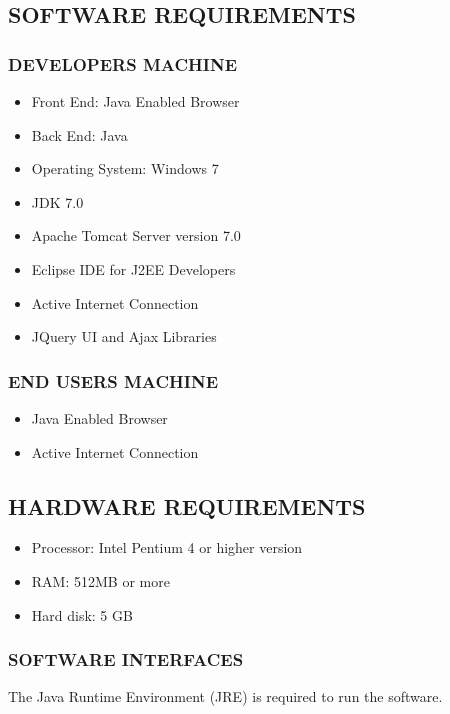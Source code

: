 \documentclass[12pt]{report}
\begin{document}
\subsection{SOFTWARE REQUIREMENTS}
\subsubsection{DEVELOPERS MACHINE}
\begin{itemize}
\item{	Front End: Java Enabled Browser }
\item{	Back End: Java }
\item{	Operating System: Windows 7 }
\item{JDK 7.0} 
\item{ Apache Tomcat Server version 7.0 }
\item {Eclipse IDE for J2EE Developers}
\item Active Internet Connection
\item JQuery UI and Ajax Libraries
\end{itemize}
\subsubsection{END USERS MACHINE}
\begin{itemize}
\item {Java Enabled Browser }
\item { Active Internet Connection }
\end{itemize}
\subsection{HARDWARE REQUIREMENTS}
\begin{itemize}
\item{Processor: Intel Pentium 4 or higher version}
\item{RAM: 512MB or more}
\item{Hard disk: 5 GB}
\end{itemize}
\subsubsection{SOFTWARE INTERFACES }
The Java Runtime Environment (JRE) is required to run the software.
\pagestyle{fancy}
\chead{}
\rfoot{\small{\thepage}}
\renewcommand{\headrulewidth}{0.4pt}
\renewcommand{\footrulewidth}{0.4pt}
\end{document}
